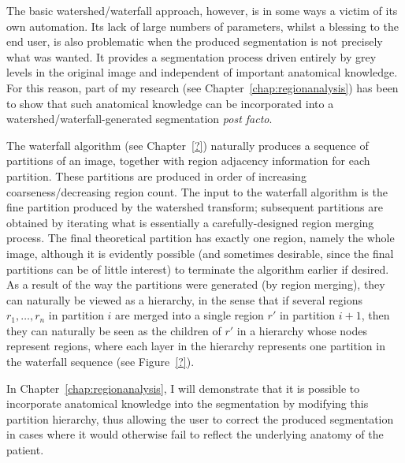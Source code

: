 The basic watershed/waterfall approach, however, is in some ways a victim of its own automation. Its lack of large numbers of parameters, whilst a blessing to the end user, is also problematic when the produced segmentation is not precisely what was wanted. It provides a segmentation process driven entirely by grey levels in the original image and independent of important anatomical knowledge. For this reason, part of my research (see Chapter~\ref{chap:regionanalysis}) has been to show that such anatomical knowledge can be incorporated into a watershed/waterfall-generated segmentation \emph{post facto}.

The waterfall algorithm (see Chapter~\ref{?}) naturally produces a sequence of partitions of an image, together with region adjacency information for each partition. These partitions are produced in order of increasing coarseness/decreasing region count. The input to the waterfall algorithm is the fine partition produced by the watershed transform; subsequent partitions are obtained by iterating what is essentially a carefully-designed region merging process. The final theoretical partition has exactly one region, namely the whole image, although it is evidently possible (and sometimes desirable, since the final partitions can be of little interest) to terminate the algorithm earlier if desired. As a result of the way the partitions were generated (by region merging), they can naturally be viewed as a hierarchy, in the sense that if several regions $r_1,\ldots,r_n$ in partition $i$ are merged into a single region $r'$ in partition $i+1$, then they can naturally be seen as the children of $r'$ in a hierarchy whose nodes represent regions, where each layer in the hierarchy represents one partition in the waterfall sequence (see Figure~\ref{?}).

In Chapter~\ref{chap:regionanalysis}, I will demonstrate that it is possible to incorporate anatomical knowledge into the segmentation by modifying this partition hierarchy, thus allowing the user to correct the produced segmentation in cases where it would otherwise fail to reflect the underlying anatomy of the patient.